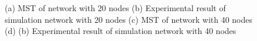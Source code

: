 \begin{figure}[H]
    \centering
    \caption{(a) MST of network with 20 nodes (b) Experimental result of simulation network with 20 nodes (c) MST of network with 40 nodes (d) (b) Experimental result of simulation network with 40 nodes}
    \label{fig:mst_20_40}
\end{figure}

